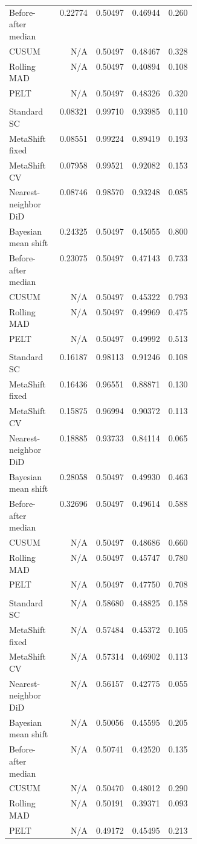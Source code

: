 {\begin{longtable}{@{}p{0.36\linewidth}rrrr@{}}
Before-after median & 0.22774 & 0.50497 & 0.46944 & 0.260 \\
CUSUM & N/A & 0.50497 & 0.48467 & 0.328 \\
Rolling MAD & N/A & 0.50497 & 0.40894 & 0.108 \\
PELT & N/A & 0.50497 & 0.48326 & 0.320 \\
\addlinespace[2pt]
\multicolumn{5}{@{}l}{\textbf{Gradual drift}}\\
\addlinespace[1pt]
Standard SC & 0.08321 & 0.99710 & 0.93985 & 0.110 \\
MetaShift fixed & 0.08551 & 0.99224 & 0.89419 & 0.193 \\
MetaShift CV & 0.07958 & 0.99521 & 0.92082 & 0.153 \\
Nearest-neighbor DiD & 0.08746 & 0.98570 & 0.93248 & 0.085 \\
Bayesian mean shift & 0.24325 & 0.50497 & 0.45055 & 0.800 \\
Before-after median & 0.23075 & 0.50497 & 0.47143 & 0.733 \\
CUSUM & N/A & 0.50497 & 0.45322 & 0.793 \\
Rolling MAD & N/A & 0.50497 & 0.49969 & 0.475 \\
PELT & N/A & 0.50497 & 0.49992 & 0.513 \\
\addlinespace[2pt]
\multicolumn{5}{@{}l}{\textbf{Temporary step}}\\
\addlinespace[1pt]
Standard SC & 0.16187 & 0.98113 & 0.91246 & 0.108 \\
MetaShift fixed & 0.16436 & 0.96551 & 0.88871 & 0.130 \\
MetaShift CV & 0.15875 & 0.96994 & 0.90372 & 0.113 \\
Nearest-neighbor DiD & 0.18885 & 0.93733 & 0.84114 & 0.065 \\
Bayesian mean shift & 0.28058 & 0.50497 & 0.49930 & 0.463 \\
Before-after median & 0.32696 & 0.50497 & 0.49614 & 0.588 \\
CUSUM & N/A & 0.50497 & 0.48686 & 0.660 \\
Rolling MAD & N/A & 0.50497 & 0.45747 & 0.780 \\
PELT & N/A & 0.50497 & 0.47750 & 0.708 \\
\addlinespace[2pt]
\multicolumn{5}{@{}l}{\textbf{Variance increase}}\\
\addlinespace[1pt]
Standard SC & N/A & 0.58680 & 0.48825 & 0.158 \\
MetaShift fixed & N/A & 0.57484 & 0.45372 & 0.105 \\
MetaShift CV & N/A & 0.57314 & 0.46902 & 0.113 \\
Nearest-neighbor DiD & N/A & 0.56157 & 0.42775 & 0.055 \\
Bayesian mean shift & N/A & 0.50056 & 0.45595 & 0.205 \\
Before-after median & N/A & 0.50741 & 0.42520 & 0.135 \\
CUSUM & N/A & 0.50470 & 0.48012 & 0.290 \\
Rolling MAD & N/A & 0.50191 & 0.39371 & 0.093 \\
PELT & N/A & 0.49172 & 0.45495 & 0.213 \\
\end{longtable}
}
